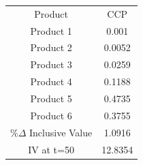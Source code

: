 \begin{tabular}{cc}
Product & CCP \\
Product 1 & 0.001 \\
Product 2 & 0.0052 \\
Product 3 & 0.0259 \\
Product 4 & 0.1188 \\
Product 5 & 0.4735 \\
Product 6 & 0.3755 \\
$\%\Delta$ Inclusive Value & 1.0916 \\
IV at t=50 & 12.8354 \\
\end{tabular}